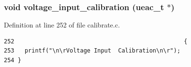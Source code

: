 \subsubsection{\setlength{\rightskip}{0pt plus 5cm}void voltage\_\-input\_\-calibration ({\bf ueac\_\-t} $\ast$)}\label{calibrate_8h_a2}




Definition at line 252 of file calibrate.c.

\footnotesize\begin{verbatim}252                                                 {
253   printf("\n\rVoltage Input  Calibration\n\r");
254 }
\end{verbatim}\normalsize 


